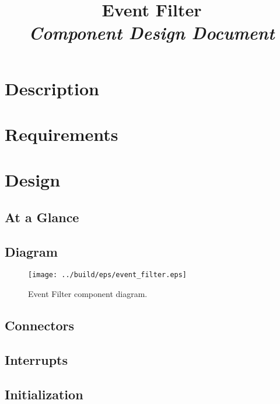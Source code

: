 



\title{\textbf{Event Filter} \\
\large\textit{Component Design Document}}
\date{}
\maketitle

\section{Description}


\section{Requirements}


\section{Design}

\subsection{At a Glance}


\subsection{Diagram}
\begin{figure}[H]
  \texttt{[image: ../build/eps/event\_filter.eps]}
  \caption{Event Filter component diagram.}
\end{figure}

\subsection{Connectors}


\subsection{Interrupts}



\subsection{Initialization}


